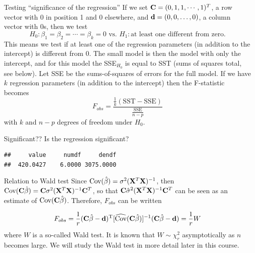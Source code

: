 \documentclass[
  ignorenonframetext,
]{beamer}
\newenvironment{Shaded}{\begin{snugshade}}{\end{snugshade}}
\newcommand{\FunctionTok}[1]{\textcolor[rgb]{0.13,0.29,0.53}{\textbf{#1}}}
\newcommand{\NormalTok}[1]{#1}
\newcommand{\SpecialCharTok}[1]{\textcolor[rgb]{0.81,0.36,0.00}{\textbf{#1}}}
\begin{document}
\begin{frame}{Testing ``significance of the regression''}
\label{testing-significance-of-the-regression}
If we set \({\bf C}=(0,1,1, \cdots ,1)^T\), a row vector with 0 in
position 1 and 0 elsewhere, and \({\bf d}=(0,0,\ldots,0)\), a column
vector with 0s, then we test
\[ H_0: \beta_1=\beta_2=\cdots= \beta_k =0 \text{ vs. } H_1: \text{at least one different from zero}.\]
This means we test if at least one of the regression parameters (in
addition to the intercept) is different from 0. The small model is then
the model with only the intercept, and for this model the SSE\(_{H_0}\)
is equal to SST (sums of squares total, see below). Let SSE be the
sums-of-squares of errors for the full model. If we have \(k\)
regression parameters (in addition to the intercept) then the
F-statistic becomes
\[ F_{obs}=\frac{\frac{1}{k}(\text{SST}-\text{SSE})}{\frac{\text{SSE}}{n-p}}\]
with \(k\) and \(n-p\) degrees of freedom under \(H_0\).
\end{frame}

\begin{frame}[fragile]{Significant??}
\label{significant}
Is the regression significant?

\begin{Shaded}
\end{Shaded}

\begin{verbatim}
##     value     numdf     dendf 
##  420.0427    6.0000 3075.0000
\end{verbatim}
\end{frame}

\begin{frame}{Relation to Wald test}
\label{relation-to-wald-test}
Since \(\text{Cov}(\hat{\beta})=\sigma^2 ({\bf X}^T{\bf X})^{-1}\), then
\(\text{Cov}({\bf C}\hat{\beta})={\bf C}\sigma^2({\bf X}^T{\bf X})^{-1}{\bf C}^T\),
so that \({\bf C}\hat{\sigma}^2({\bf X}^T{\bf X})^{-1}{\bf C}^T\) can be
seen as an estimate of \(\text{Cov}({\bf C}\hat{\beta})\). Therefore,
\(F_{obs}\) can be written

\[F_{obs}=\frac{1}{r}({\bf C}\hat{ {\bf \beta}}-{\bf d})^{\text T}[\widehat{\text{Cov}}({\bf C}\hat{\beta})]^{-1}({\bf C}\hat{ {\bf \beta}}-{\bf d})=\frac{1}{r}W\]
where \(W\) is a so-called Wald test. It is known that
\(W\sim \chi^2_r\) asymptotically as \(n\) becomes large. We will study
the Wald test in more detail later in this course.
\end{frame}
\end{document}
